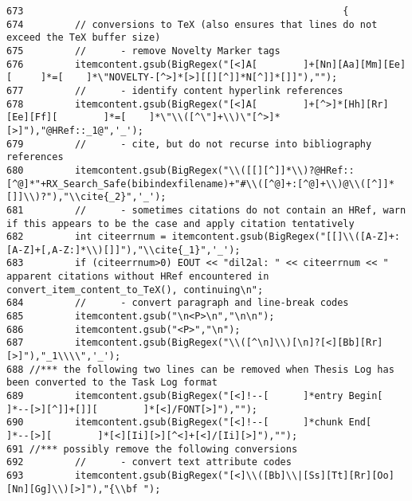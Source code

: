 \footnotesize\begin{verbatim}673                                                        {
674         // conversions to TeX (also ensures that lines do not exceed the TeX buffer size)
675         //      - remove Novelty Marker tags
676         itemcontent.gsub(BigRegex("[<]A[        ]+[Nn][Aa][Mm][Ee][     ]*=[    ]*\"NOVELTY-[^>]*[>][[][^]]*N[^]]*[]]"),"");
677         //      - identify content hyperlink references
678         itemcontent.gsub(BigRegex("[<]A[        ]+[^>]*[Hh][Rr][Ee][Ff][        ]*=[    ]*\"\\([^\"]+\\)\"[^>]*[>]"),"@HRef::_1@",'_');
679         //      - cite, but do not recurse into bibliography references
680         itemcontent.gsub(BigRegex("\\([[][^]]*\\)?@HRef::[^@]*"+RX_Search_Safe(bibindexfilename)+"#\\([^@]+:[^@]+\\)@\\([^]]*[]]\\)?"),"\\cite{_2}",'_');
681         //      - sometimes citations do not contain an HRef, warn if this appears to be the case and apply citation tentatively
682         int citeerrnum = itemcontent.gsub(BigRegex("[[]\\([A-Z]+:[A-Z]+[,A-Z:]*\\)[]]"),"\\cite{_1}",'_');
683         if (citeerrnum>0) EOUT << "dil2al: " << citeerrnum << " apparent citations without HRef encountered in convert_item_content_to_TeX(), continuing\n";
684         //      - convert paragraph and line-break codes
685         itemcontent.gsub("\n<P>\n","\n\n");
686         itemcontent.gsub("<P>","\n");
687         itemcontent.gsub(BigRegex("\\([^\n]\\)[\n]?[<][Bb][Rr][>]"),"_1\\\\",'_');
688 //*** the following two lines can be removed when Thesis Log has been converted to the Task Log format
689         itemcontent.gsub(BigRegex("[<]!--[      ]*entry Begin[  ]*--[>][^]]+[]][        ]*[<]/FONT[>]"),"");
690         itemcontent.gsub(BigRegex("[<]!--[      ]*chunk End[    ]*--[>][        ]*[<][Ii][>][^<]+[<]/[Ii][>]"),"");
691 //*** possibly remove the following conversions
692         //      - convert text attribute codes
693         itemcontent.gsub(BigRegex("[<]\\([Bb]\\|[Ss][Tt][Rr][Oo][Nn][Gg]\\)[>]"),"{\\bf ");

\end{verbatim}
